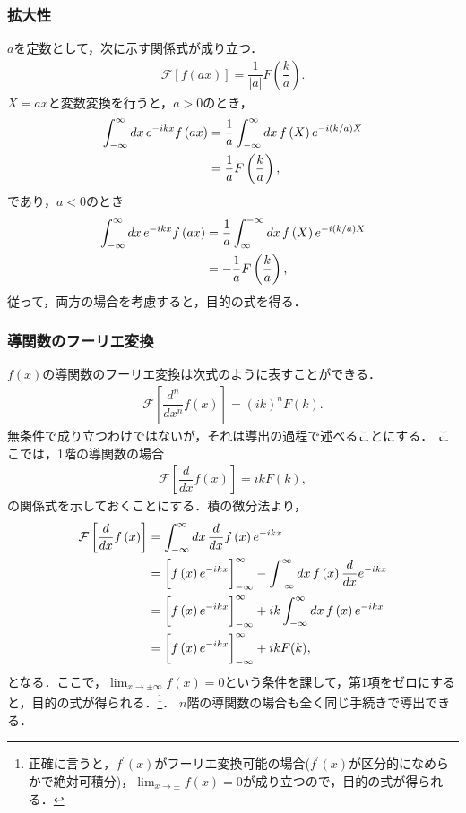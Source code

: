 \subsubsection{拡大性}
%
$a$を定数として，次に示す関係式が成り立つ．
\begin{align}
 \mathcal{F}\left[f\left(ax\right)\right] = \dfrac{1}{\left|a\right|}F\left(\dfrac{k}{a}\right). 
\end{align}
%
$X=ax$と変数変換を行うと，$a>0$のとき，
\begin{align}
 \int_{-\infty}^{\infty}dx\,e^{-ikx}f\left(ax\right) 
 & = \dfrac{1}{a} \int_{-\infty}^{\infty}dx\,f\left(X\right)e^{-i(k/a)X} \notag \\
 & = \dfrac{1}{a}F\left(\dfrac{k}{a}\right),
\end{align}
であり，$a<0$のとき
\begin{align}
 \int_{-\infty}^{\infty}dx\,e^{-ikx}f\left(ax\right) 
 & = \dfrac{1}{a} \int_{\infty}^{-\infty}dx\,f\left(X\right)e^{-i(k/a)X} \notag \\
 & = -\dfrac{1}{a}F\left(\dfrac{k}{a}\right),
\end{align}
従って，両方の場合を考慮すると，目的の式を得る．
%
\subsubsection{導関数のフーリエ変換}
%
$f(x)$の導関数のフーリエ変換は次式のように表すことができる．
\begin{align}
 \mathcal{F}\left[\dfrac{d^n}{dx^n}f\left(x\right)\right] = \left(ik\right)^{n} F\left(k\right). 
\end{align}
無条件で成り立つわけではないが，それは導出の過程で述べることにする．
ここでは，1階の導関数の場合
\begin{align}
 \mathcal{F}\left[\dfrac{d}{dx}f\left(x\right)\right] = ik F\left(k\right),
\end{align}
の関係式を示しておくことにする．積の微分法より，
%
\begin{align}
 \mathcal{F}\left[\dfrac{d}{dx}f\left(x\right)\right] 
 &= \int_{-\infty}^{\infty}dx\,\dfrac{d}{dx}f\left(x\right)e^{-ikx} \notag \\
 &= \biggl[f\left(x\right)e^{-ikx}\biggr]_{-\infty}^{\infty} - \int_{-\infty}^{\infty}dx\,f\left(x\right)\dfrac{d}{dx}e^{-ikx} \notag \\ 
 &= \biggl[f\left(x\right)e^{-ikx}\biggr]_{-\infty}^{\infty} + ik \int_{-\infty}^{\infty}dx\,f\left(x\right)e^{-ikx} \notag \\
 &= \biggl[f\left(x\right)e^{-ikx}\biggr]_{-\infty}^{\infty} + ik F(k), 
\end{align}
となる．ここで，$\displaystyle\lim_{x\to \pm \infty}f\left(x\right)=0$という条件を課して，第1項をゼロにすると，目的の式が得られる．\footnote{正確に言うと，$f^{\prime}(x)$がフーリエ変換可能の場合($f^{\prime}(x)$が区分的になめらかで絶対可積分)，$\displaystyle\lim_{x\to \pm}f(x) = 0$が成り立つので，目的の式が得られる．}．
$n$階の導関数の場合も全く同じ手続きで導出できる．

